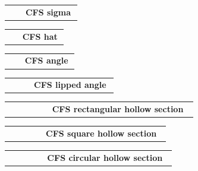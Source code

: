 \documentclass[11pt]{article}
\makeatletter
\newcommand{\ExampleRow}[3]{%
  \begin{tabular}{@{}m{0.22\linewidth}m{0.74\linewidth}@{}}
    \begin{tikzpicture}[baseline=(current bounding box.center)]
      #3
    \end{tikzpicture}
    &
    \textbf{#1}\par
    \vspace{2pt}
    {\raggedright\ttfamily\scriptsize\detokenize{#2}\par}
  \end{tabular}
  \par\vspace{8mm}
}
\makeatother
\begin{document}
\ExampleRow
  {CFS sigma}
  {\TikZSectionsSigma[detailed=true, depth=180, top flange=55, top lip=18, bottom flange=60, bottom lip=20, thickness=2, radius=4, scale=0.025]}
  {\TikZSectionsSigma[detailed=true, depth=180, top flange=55, top lip=18, bottom flange=60, bottom lip=20, thickness=2, radius=4, scale=0.025]}

\ExampleRow
  {CFS hat}
  {\TikZSectionsHat[depth=100, width=45, left flange=25, right flange=25, thickness=2, radius=4, scale=0.035]}
  {\TikZSectionsHat[depth=100, width=45, left flange=25, right flange=25, thickness=2, radius=4, scale=0.035]}

\ExampleRow
  {CFS angle}
  {\TikZSectionsAngle[vertical leg=100, horizontal leg=60, thickness=2, radius=4, scale=0.035]}
  {\TikZSectionsAngle[vertical leg=100, horizontal leg=60, thickness=2, radius=4, scale=0.035]}

\ExampleRow
  {CFS lipped angle}
  {\TikZSectionsLippedAngle[vertical leg=100, horizontal leg=60, lip=20, thickness=2, radius=4, scale=0.035]}
  {\TikZSectionsLippedAngle[vertical leg=100, horizontal leg=60, lip=20, thickness=2, radius=4, scale=0.035]}

\ExampleRow
  {CFS rectangular hollow section}
  {\TikZSectionsRHS[depth=120, width=70, thickness=2, radius=4, scale=0.035]}
  {\TikZSectionsRHS[depth=120, width=70, thickness=2, radius=4, scale=0.035]}

\ExampleRow
  {CFS square hollow section}
  {\TikZSectionsSHS[width=80, thickness=2, radius=4, scale=0.035]}
  {\TikZSectionsSHS[width=80, thickness=2, radius=4, scale=0.035]}

\ExampleRow
  {CFS circular hollow section}
  {\TikZSectionsCHS[radius=35, thickness=2, scale=0.035]}
  {\TikZSectionsCHS[radius=35, thickness=2, scale=0.035]}
\end{document}
